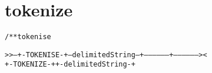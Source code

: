 \section{tokenize}
\begin{shaded}
\begin{alltt}
/** tokenise

   >>--+-TOKENISE-+--delimitedString--+-----------------+-----------------><
       +-TOKENIZE-+                   +-delimitedString-+

\end{alltt}
\end{shaded}

